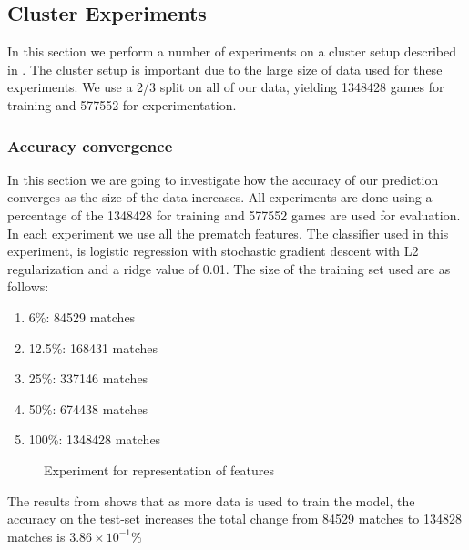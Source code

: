 \subsection{Cluster Experiments}\label{sec:clustertest}
In this section we perform a number of experiments on a cluster setup described in . The cluster setup is important due to the large size of data used for these experiments.
We use a 2/3 split on all of our data, yielding 1348428 games for training and 577552 for experimentation.

\subsubsection{Accuracy convergence}
In this section we are going to investigate how the accuracy of our prediction converges as the size of the data increases.
All experiments are done using a percentage of the 1348428 for training and 577552 games are used for evaluation. In each experiment we use all the prematch features. The classifier used in this experiment, is logistic regression with stochastic gradient descent with L2 regularization and a ridge value of 0.01. The size of the training set used are as follows: 
\begin{enumerate}
\item 6\%: 84529 matches
\item 12.5\%: 168431 matches 
\item 25\%: 337146 matches 
\item 50\%: 674438 matches
\item 100\%: 1348428 matches 
\end{enumerate}
\begin{figure}[!htb]
  \centering
{}
  \caption{Experiment for representation of features}\label{fig:clusterbigdata}
\end{figure}
The results from  shows that as more data is used to train the model, the accuracy on the test-set increases the total change from 84529 matches to 134828 matches is $3.86\times10^{-1}\%$

